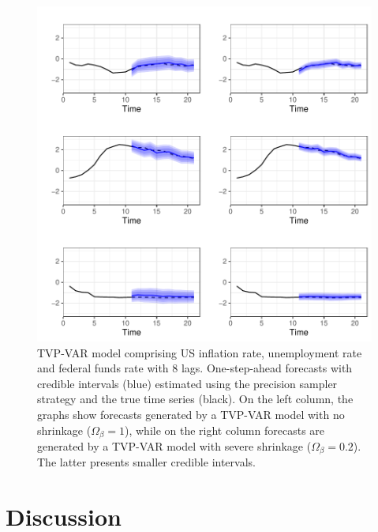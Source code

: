\documentclass[
  12pt,
]{book}
\theoremstyle{break}
\theoremstyle{nonumberplain}
\begin{document}
\begin{figure}[H]

{\centering \includegraphics{Dynamic-Shrinkage-in-Bayesian-Structural-Time-Series-and-Vector-Autoregressive-Models_files/figure-latex/myfig722-1} 

}

\caption{TVP-VAR model comprising US inflation rate, unemployment rate and federal funds rate with 8 lags. One-step-ahead forecasts with credible intervals (blue) estimated using the precision sampler strategy and the true time series (black). On the left column, the graphs show forecasts generated by a TVP-VAR model with no shrinkage ($\Omega_\beta=1$), while on the right column forecasts are generated by a TVP-VAR model with severe shrinkage ($\Omega_\beta=0.2$). The latter presents smaller credible intervals.}\label{fig:myfig722}
\end{figure}

\section{Discussion}
\end{document}
